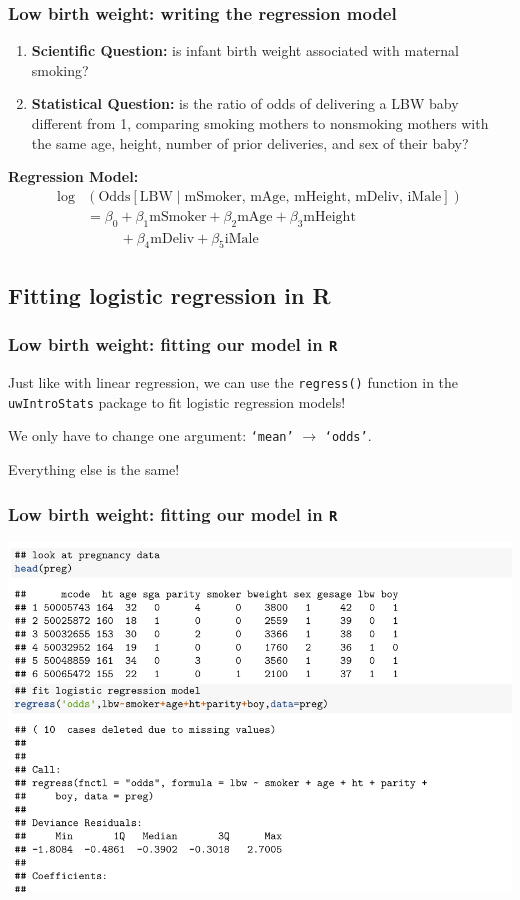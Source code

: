 \documentclass[12pt, 
hyperref={colorlinks=true, linkcolor=blue, urlcolor=cyan}]{beamer}
\begin{document}
\begin{frame}
\frametitle{Low birth weight: writing the regression model}

\begin{enumerate}
\item \textbf{Scientific Question:} is infant birth weight associated with maternal smoking? \pause
\item \textbf{Statistical Question:} is the ratio of odds of delivering a LBW baby different from 1, comparing smoking mothers to nonsmoking mothers with the same age, height, number of prior deliveries, and sex of their baby? \pause
\end{enumerate}

\textbf{Regression Model:}
\begin{align*}
\log & \left(\text{Odds}[ \text{LBW} \mid \text{mSmoker, mAge, mHeight, mDeliv, iMale}]\right) \\
& = \beta_0 + \beta_1 \text{mSmoker} + \beta_2 \text{mAge} + \beta_3 \text{mHeight} \\
& \hspace{1cm} + \beta_4 \text{mDeliv} + \beta_5 \text{iMale}
\end{align*}

\end{frame}

\subsection{Fitting logistic regression in R}
\begin{frame}
\frametitle{Low birth weight: fitting our model in \texttt{R}}
Just like with linear regression, we can use the \texttt{regress()} function in the \texttt{uwIntroStats} package to fit logistic regression models!

We only have to change one argument: \texttt{`mean'} $\rightarrow$ \texttt{`odds'}.

Everything else is the same!
\end{frame}

\begin{frame}
\frametitle{Low birth weight: fitting our model in \texttt{R}}
\includegraphics[width=\textwidth]{./figs/pregnancy_head}
\end{frame}
\end{document}
